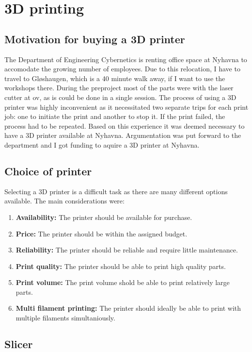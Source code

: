 \section{3D printing}

\subsection{Motivation for buying a 3D printer}
The Department of Engineering Cybernetics is renting office space at Nyhavna to accomodate the growing number of employees.
Due to this relocation, I have to travel to Gløshaugen, which is a 40 minute walk away, if I want to use the workshops there.
During the preproject most of the parts were with the laser cutter at \gls{ov}, as is could be done in a single session.
The process of using a 3D printer was highly inconvenient as it necessitated two separate trips for each print job: one to initiate the print and another to stop it.
If the print failed, the process had to be repeated.
Based on this experience it was deemed necessary to have a 3D printer available at Nyhavna.
Argumentation was put forward to the department and I got funding to aquire a 3D printer at Nyhavna.

\subsection{Choice of printer}
Selecting a 3D printer is a difficult task as there are many different options available.
The main considerations were:
\begin{enumerate}
    \item \textbf{Availability:} The printer should be available for purchase.
    \item \textbf{Price:} The printer should be within the assigned budget.
    \item \textbf{Reliability:} The printer should be reliable and require little maintenance.
    \item \textbf{Print quality:} The printer should be able to print high quality parts.
    \item \textbf{Print volume:} The print volume shold be able to print relatively large parts.
    \item \textbf{Multi filament printing:} The printer should ideally be able to print with multiple filaments simultaniously.
\end{enumerate}



\subsection{Slicer}
\label{sec:slicer}


